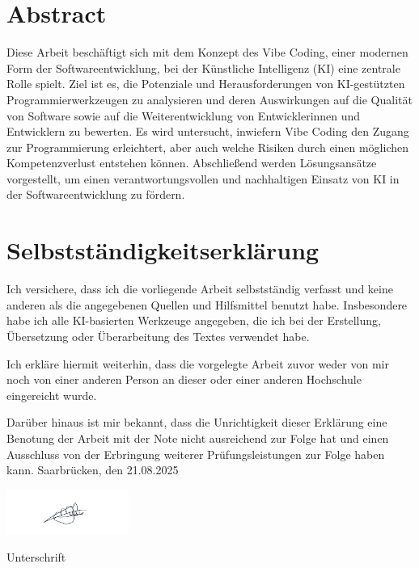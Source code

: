 \documentclass[paper=a4,fontsize=12pt,ngerman]{scrartcl}
\begin{document}
\pagestyle{plain}



\section*{Abstract}
Diese Arbeit beschäftigt sich mit dem Konzept des Vibe Coding, einer modernen Form der Softwareentwicklung, bei der Künstliche Intelligenz (KI) eine zentrale Rolle spielt. Ziel ist es, die Potenziale und Herausforderungen von KI-gestützten Programmierwerkzeugen zu analysieren und deren Auswirkungen auf die Qualität von Software sowie auf die Weiterentwicklung von Entwicklerinnen und Entwicklern zu bewerten. Es wird untersucht, inwiefern Vibe Coding den Zugang zur Programmierung erleichtert, aber auch welche Risiken durch einen möglichen Kompetenzverlust entstehen können. Abschließend werden Lösungsansätze vorgestellt, um einen verantwortungsvollen und nachhaltigen Einsatz von KI in der Softwareentwicklung zu fördern.

\clearpage
\section*{Selbstständigkeitserklärung}
Ich versichere, dass ich die vorliegende Arbeit selbstständig verfasst und 
keine anderen als die angegebenen Quellen und Hilfsmittel benutzt habe.
Insbesondere habe ich alle KI-basierten Werkzeuge angegeben, die ich bei
der Erstellung, Übersetzung oder Überarbeitung des Textes verwendet habe.

Ich erkläre hiermit weiterhin, dass die vorgelegte Arbeit zuvor weder von mir 
noch von einer anderen Person an dieser oder einer anderen Hochschule 
eingereicht wurde.

Darüber hinaus ist mir bekannt, dass die Unrichtigkeit dieser Erklärung eine 
Benotung der Arbeit mit der Note \glqq nicht ausreichend\grqq{} zur Folge hat 
und einen Ausschluss von der Erbringung weiterer Prüfungsleistungen zur Folge 
haben kann.
\bigskip
Saarbrücken, den 21.08.2025

\smallskip
\vspace{1cm}
\noindent

\begin{flushright}
    \includegraphics[width=4cm]{draw-signature.png}
\end{flushright}
Unterschrift
\end{document}
